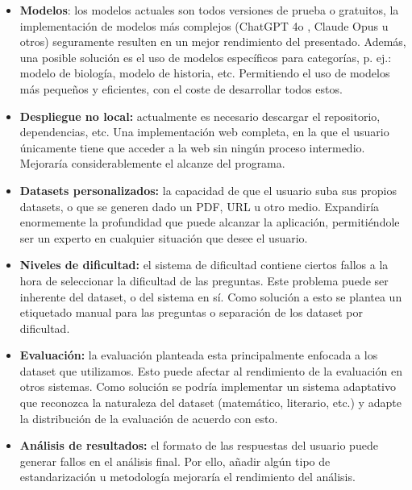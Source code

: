 \documentclass[12pt, a4paper]{article}
\begin{document}
\begin{itemize}
    \item \textbf{Modelos}: los modelos actuales son todos versiones de prueba o gratuitos, la implementación de modelos más complejos (ChatGPT 4o \cite{openai2023gpt4}, Claude Opus \cite{opus} u otros) seguramente resulten en un mejor rendimiento del presentado. Además, una posible solución es el uso de modelos específicos para categorías, p. ej.: modelo de biología, modelo de historia, etc. Permitiendo el uso de modelos más pequeños y eficientes, con el coste de desarrollar todos estos.
    \item \textbf{Despliegue no local:} actualmente es necesario descargar el repositorio, dependencias, etc. Una implementación web completa, en la que el usuario únicamente tiene que acceder a la web sin ningún proceso intermedio. Mejoraría considerablemente el alcanze del programa. 
    \label{sec:datasets}
    \item \textbf{Datasets personalizados:} la capacidad de que el usuario suba sus propios datasets, o que se generen dado un PDF, URL u otro medio. Expandiría enormemente la profundidad que puede alcanzar la aplicación, permitiéndole ser un experto en cualquier situación que desee el usuario.
    \item \textbf{Niveles de dificultad:} el sistema de dificultad contiene ciertos fallos a la hora de seleccionar la dificultad de las preguntas. Este problema puede ser inherente del dataset, o del sistema en sí. Como solución a esto se plantea un etiquetado manual para las preguntas o separación de los dataset por dificultad.
    \item \textbf{Evaluación:} la evaluación planteada esta principalmente enfocada a los dataset que utilizamos. Esto puede afectar al rendimiento de la evaluación en otros sistemas. Como solución se podría implementar un sistema adaptativo que reconozca la naturaleza del dataset (matemático, literario, etc.) y adapte la distribución de la evaluación de acuerdo con esto. 
    \item \textbf{Análisis de resultados:} el formato de las respuestas del usuario puede generar fallos en el análisis final. Por ello, añadir algún tipo de estandarización u metodología mejoraría el rendimiento del análisis. 
\end{itemize}

\newpage
\appendix
\end{document}
